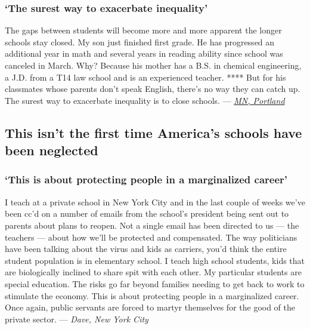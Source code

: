 \hypertarget{the-surest-way-to-exacerbate-inequality}{%
\subsubsection{\texorpdfstring{\textbf{`\textbf{The surest way to
exacerbate
inequality}'}}{`The surest way to exacerbate inequality'}}\label{the-surest-way-to-exacerbate-inequality}}

The gaps between students will become more and more apparent the longer
schools stay closed. My son just finished first grade. He has progressed
an additional year in math and several years in reading ability since
school was canceled in March. Why? Because his mother has a B.S. in
chemical engineering, a J.D. from a T14 law school and is an experienced
teacher. **** But for his classmates whose parents don't speak English,
there's no way they can catch up. The surest way to exacerbate
inequality is to close schools. ---
\href{https://nyti.ms/3juPoXN\#permid=108208754}{\emph{MN, Portland}}

\hypertarget{this-isnt-the-first-time-americas-schools-have-been-neglected}{%
\subsection{This isn't the first time America's schools have been
neglected}\label{this-isnt-the-first-time-americas-schools-have-been-neglected}}

\hypertarget{this-is-about-protecting-people-in-a-marginalized-career}{%
\subsubsection{\texorpdfstring{\textbf{`This is about protecting people
in a marginalized
career'}}{`This is about protecting people in a marginalized career'}}\label{this-is-about-protecting-people-in-a-marginalized-career}}

I teach at a private school in New York City and in the last couple of
weeks we've been cc'd on a number of emails from the school's president
being sent out to parents about plans to reopen. Not a single email has
been directed to us --- the teachers --- about how we'll be protected
and compensated. The way politicians have been talking about the virus
and kids as carriers, you'd think the entire student population is in
elementary school. I teach high school students, kids that are
biologically inclined to share spit with each other. My particular
students are special education. The risks go far beyond families needing
to get back to work to stimulate the economy. This is about protecting
people in a marginalized career. Once again, public servants are forced
to martyr themselves for the good of the private sector. --- \emph{Dave,
New York City}

